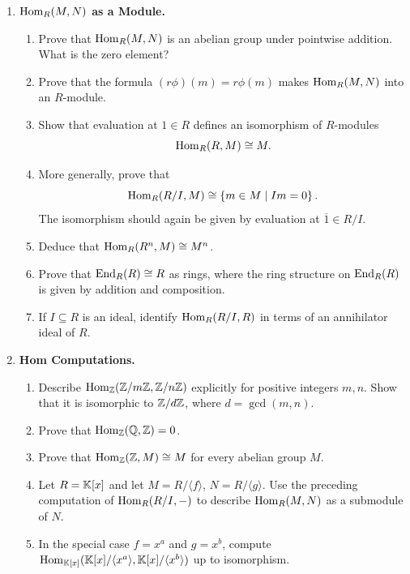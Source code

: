 \documentclass[12pt,reqno]{amsart}
\begin{document}
\begin{enumerate}[leftmargin=*, resume=problems]
\item \textbf{$\operatorname{Hom}_R(M,N)$ as a Module.}
    \begin{enumerate}
    \item Prove that $\operatorname{Hom}_R(M,N)$ is an abelian group under pointwise addition. What is the zero element?
    \item Prove that the formula $(r\phi)(m)=r\phi(m)$ makes $\operatorname{Hom}_R(M,N)$ into an $R$-module.
    \item Show that evaluation at $1\in R$ defines an isomorphism of $R$-modules
    \[
    \operatorname{Hom}_R(R,M)\cong M.
    \]
    \item More generally, prove that
    \[
    \operatorname{Hom}_R(R/I,M)\cong \left\{m\in M\mid Im=0\right\}.
    \]
    The isomorphism should again be given by evaluation at $\overline{1}\in R/I$.
    \item Deduce that $\operatorname{Hom}_R(R^n,M)\cong M^n$.
    \item Prove that $\operatorname{End}_R(R)\cong R$ as rings, where the ring structure on $\operatorname{End}_R(R)$ is given by addition and composition.
    \item If $I\subseteq R$ is an ideal, identify $\operatorname{Hom}_R(R/I,R)$ in terms of an annihilator ideal of $R$.
    \end{enumerate}

\item \textbf{Hom Computations.}
    \begin{enumerate}
    \item Describe $\operatorname{Hom}_{\mathbb{Z}}(\mathbb{Z}/m\mathbb{Z},\mathbb{Z}/n\mathbb{Z})$ explicitly for positive integers $m,n$. Show that it is isomorphic to $\mathbb{Z}/d\mathbb{Z}$, where $d=\gcd(m,n)$.
    \item Prove that $\operatorname{Hom}_{\mathbb{Z}}(\mathbb{Q},\mathbb{Z})=0$.
    \item Prove that $\operatorname{Hom}_{\mathbb{Z}}(\mathbb{Z},M)\cong M$ for every abelian group $M$.
    \item Let $R=\mathbb{K}[x]$ and let $M=R/\langle f\rangle$, $N=R/\langle g\rangle$. Use the preceding computation of $\operatorname{Hom}_R(R/I,-)$ to describe $\operatorname{Hom}_R(M,N)$ as a submodule of $N$.
    \item In the special case $f=x^a$ and $g=x^b$, compute $\operatorname{Hom}_{\mathbb{K}[x]}(\mathbb{K}[x]/\langle x^a\rangle,\mathbb{K}[x]/\langle x^b\rangle)$ up to isomorphism.
    \end{enumerate}


\end{enumerate}
\end{document}
